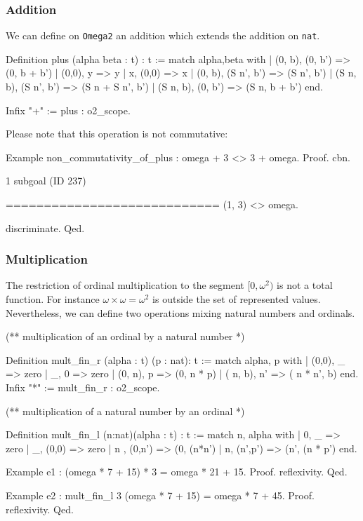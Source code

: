 \subsubsection{Addition}

We can define on \texttt{Omega2} an addition which extends the addition on \texttt{nat}.

\begin{Coqsrc}
Definition  plus (alpha beta : t) : t :=
  match alpha,beta with
  | (0, b), (0, b') => (0, b + b')
  | (0,0), y  => y
  | x, (0,0)  => x
  | (0, b), (S n', b') => (S n', b')
  | (S n, b), (S n', b') => (S n + S n', b')
  | (S n, b), (0, b') => (S n, b + b')
   end.

Infix "+" := plus : o2_scope.
\end{Coqsrc}

Please note that this operation is not commutative:

\begin{Coqsrc}
Example non_commutativity_of_plus :  omega + 3 <> 3 + omega.
Proof.
  cbn.
\end{Coqsrc}

\begin{Coqanswer}
1 subgoal (ID 237)
  
  ============================
(1, 3) <> omega.
\end{Coqanswer}

\begin{Coqsrc}
 discriminate.
Qed.
\end{Coqsrc}


\subsubsection{Multiplication}

The restriction of ordinal multiplication to the segment $[0,\omega^2)$ is not a total function.
For instance $\omega\times\omega= \omega^2$ is outside the set of represented values.
Nevertheless, we can define two operations mixing natural numbers and ordinals.

\begin{Coqsrc}
(** multiplication of an ordinal by a natural number *)

Definition mult_fin_r  (alpha : t) (p : nat): t :=
  match alpha, p with
 |  (0,0), _  => zero
 |  _, 0 => zero
 |  (0, n), p => (0, n * p)
 |  ( n, b),  n' => ( n *  n', b)
 end.
Infix "*" := mult_fin_r : o2_scope.

(** multiplication of  a natural number by an ordinal *)

Definition mult_fin_l (n:nat)(alpha : t) : t :=
  match n, alpha with
 |  0, _  => zero
 |  _, (0,0) => zero
 |   n , (0,n') => (0, (n*n')%
 |  n, (n',p') => (n', (n * p')%
 end.

Example e1 : (omega * 7 + 15) * 3 = omega * 21 + 15.
Proof. reflexivity. Qed.

Example e2 :  mult_fin_l 3 (omega * 7 + 15) = omega * 7 + 45.
Proof. reflexivity. Qed.
\end{Coqsrc}

